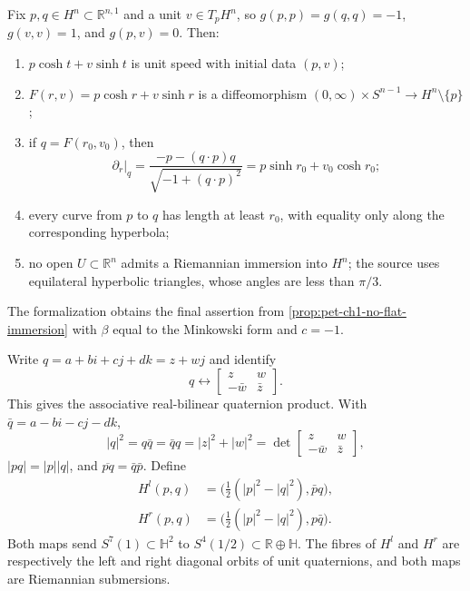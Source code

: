 \begin{remark}
  \label{rem:pet-ch1-ex-21}


  Fix $p,q\in H^n\subset\mathbb{R}^{n,1}$ and a unit
  $v\in T_pH^n$, so $g(p,p)=g(q,q)=-1$, $g(v,v)=1$, and $g(p,v)=0$. Then:
  \begin{enumerate}
    \item $p\cosh t+v\sinh t$ is unit speed with initial data $(p,v)$;
    \item
      $F(r,v)=p\cosh r+v\sinh r$ is a diffeomorphism
      $(0,\infty)\times S^{n-1}\to H^n\setminus\{p\}$;
    \item if $q=F(r_0,v_0)$, then
      \[
        \partial_r|_q
          =\frac{-p-(q\cdot p)q}{\sqrt{-1+(q\cdot p)^2}}
          =p\sinh r_0+v_0\cosh r_0;
      \]
    \item every curve from $p$ to $q$ has length at least $r_0$, with equality
      only along the corresponding hyperbola;
    \item no open $U\subset\mathbb{R}^n$ admits a Riemannian immersion into
      $H^n$; the source uses equilateral hyperbolic triangles, whose angles are
      less than $\pi/3$.
  \end{enumerate}
  The formalization obtains the final assertion from
  \cref{prop:pet-ch1-no-flat-immersion} with $\beta$ equal to the Minkowski
  form and $c=-1$.
\end{remark}

\begin{remark}
  \label{rem:pet-ch1-ex-22}


  Write $q=a+bi+cj+dk=z+wj$ and identify
  \[
    q\longleftrightarrow
      \left[\begin{smallmatrix}z&w\\-\bar w&\bar z\end{smallmatrix}\right].
  \]
  This gives the associative real-bilinear quaternion product. With
  $\bar q=a-bi-cj-dk$,
  \[
    |q|^2=q\bar q=\bar qq=|z|^2+|w|^2
      =\det\left[\begin{smallmatrix}z&w\\-\bar w&\bar z\end{smallmatrix}\right],
  \]
  $|pq|=|p||q|$, and $\overline{pq}=\bar q\bar p$. Define
  \[
  \begin{aligned}
    H^l(p,q)&=\big(\tfrac12(|p|^2-|q|^2),\bar p q\big),\\
    H^r(p,q)&=\big(\tfrac12(|p|^2-|q|^2),p\bar q\big).
  \end{aligned}
  \]
  Both maps send $S^7(1)\subset\mathbb{H}^2$ to
  $S^4(1/2)\subset\mathbb{R}\oplus\mathbb{H}$. The fibres of $H^l$ and
  $H^r$ are respectively the left and right diagonal orbits of unit
  quaternions, and both maps are Riemannian submersions.
\end{remark}


